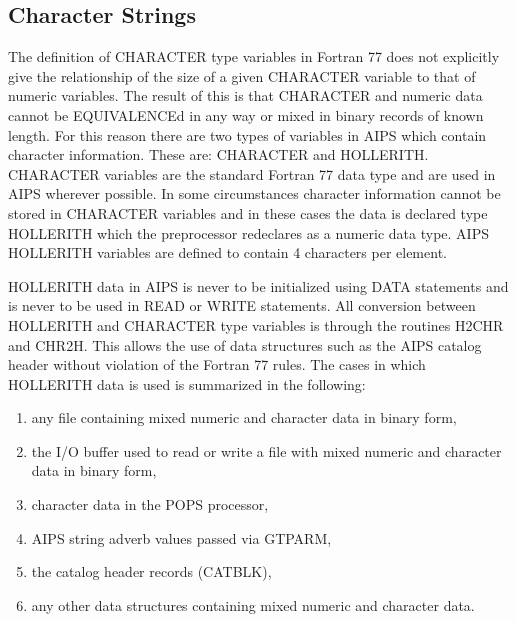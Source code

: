 
\subsection{Character Strings}
 The definition of CHARACTER type variables in Fortran 77 does not
explicitly give the relationship of the size of a given CHARACTER
variable to that of numeric variables.  The result of this is that
CHARACTER and numeric data cannot be EQUIVALENCEd in any way or mixed
in binary records of known length.  For this reason there are two
types of variables in AIPS which contain character information.  These
are: CHARACTER and HOLLERITH.  CHARACTER variables are the standard
Fortran 77 data type and are used in AIPS wherever possible.  In some
circumstances character information cannot be stored in CHARACTER
variables and in these cases the data is declared type HOLLERITH which
the preprocessor redeclares as a numeric data type.  AIPS HOLLERITH
variables are defined to contain 4 characters per element.

 HOLLERITH data in AIPS is never to be initialized using DATA
statements and is never to be used in READ or WRITE statements.  All
conversion between HOLLERITH and CHARACTER type variables is through
the routines H2CHR and CHR2H.  This allows the use of data structures
such as the AIPS catalog header without violation of the Fortran 77
rules.   The cases in which HOLLERITH data is used is summarized in
the following:
\begin{enumerate} %
\item any file containing mixed numeric and character data in binary
form,
\item the I/O buffer used to read or write a file with mixed numeric
 and character data in binary form,
\item character data in the POPS processor,
\item AIPS string adverb values passed via GTPARM,
\item the catalog header records (CATBLK),
\item any other data structures containing mixed numeric and character
data.
\end{enumerate}

